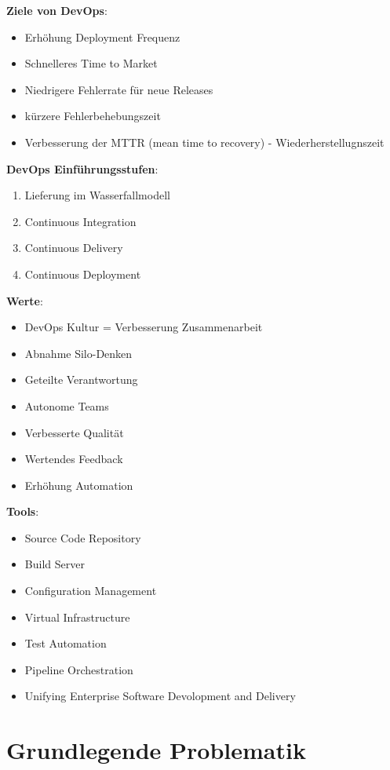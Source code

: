 \documentclass{report}
\theoremstyle{definition}
\theoremstyle{example}
\begin{document}
\textbf{Ziele von DevOps}:
\begin{itemize}
	\item Erhöhung Deployment Frequenz
	\item Schnelleres Time to Market
	\item Niedrigere Fehlerrate für neue Releases
	\item kürzere Fehlerbehebungszeit
	\item Verbesserung der MTTR (mean time to recovery) - Wiederherstellugnszeit
\end{itemize}

\textbf{DevOps Einführungsstufen}:
\begin{enumerate}
	\item Lieferung im Wasserfallmodell
	\item Continuous Integration
	\item Continuous Delivery
	\item Continuous Deployment
\end{enumerate}

\textbf{Werte}:
\begin{itemize}
	\item DevOps Kultur = Verbesserung Zusammenarbeit
	\item Abnahme Silo-Denken
	\item Geteilte Verantwortung
	\item Autonome Teams
	\item Verbesserte Qualität
	\item Wertendes Feedback
	\item Erhöhung Automation
\end{itemize}

\textbf{Tools}:
\begin{itemize}
	\item Source Code Repository
	\item Build Server
	\item Configuration Management
	\item Virtual Infrastructure
	\item Test Automation
	\item Pipeline Orchestration
	\item Unifying Enterprise Software Devolopment and Delivery
\end{itemize}

\section{Grundlegende Problematik}
\end{document}
